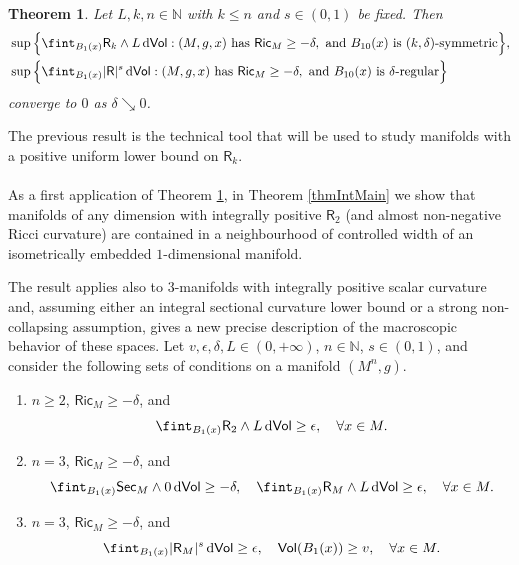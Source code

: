 \documentclass[10pt]{article}
\newtheorem{thm}{Theorem}[section]
\theoremstyle{definition}
\newcommand{\bb}[1]{\mathbb{#1}}
\newcommand{\ssf}[1]{\mathsf{#1}}
\newcommand{\Ric}{\mathsf{Ric}}
\newcommand{\R}{\mathsf{R}}
\newcommand{\de}{{\rm d}}
\begin{document}
\begin{thm} \label{CT1}
    Let $L,k,n \in \bb{N}$ with $k \leq n$ and $s \in (0,1)$ be fixed. Then 
    \begin{align*}
    &\sup \Big\{\fint_{B_1(x)} \R_{k} \wedge L \, \de \ssf{Vol} : (M,g,x) \text{ has } \Ric_{M} \geq -\delta, \text{ and } B_{10}(x) \text{ is  $(k,\delta)$-symmetric} 
    \Big\} ,
    \\
    &  \sup \Big\{\fint_{B_1(x)} |\R|^s \, \de \ssf{Vol} : (M,g,x) \text{ has } \Ric_{M} \geq -\delta, \text{ and } B_{10}(x) \text{ is } \delta \text{-regular} 
    \Big\}  
    \end{align*}
    converge to $0$ as $\delta \searrow 0$.
    \end{thm}

The previous result is the technical tool that will be used to study manifolds with a positive uniform lower bound on $\R_k$. 
\\
\\
As a first application of Theorem \ref{CT1}, in Theorem \ref{thmIntMain} we show that manifolds of any dimension with integrally positive $\R_2$ (and almost non-negative Ricci curvature) are contained in a neighbourhood of controlled width of an isometrically embedded $1$-dimensional manifold. 

The result applies also to $3$-manifolds with integrally positive scalar curvature and, assuming either an integral sectional curvature lower bound or a strong non-collapsing assumption, gives a new precise description of the macroscopic behavior of these spaces. Let $v,\epsilon, \delta,L \in (0,+\infty)$, $n \in \bb{N}$, $s \in (0,1)$, and consider the following sets of conditions on a manifold $(M^n,g)$.

\begin{enumerate}[label = (\roman*)]
        \item \label{Condition1Int}  $n\geq 2$, $\ssf{Ric}_{M} \geq -\delta$, and
    \begin{equation*} %
     \fint_{B_1(x)} \R_{2} \wedge L \,\de\ssf{Vol}  \geq \epsilon, \quad \forall x \in M.
    \end{equation*}
    \item\label{condition2Int} $n=3$, $\ssf{Ric}_{M} \geq -\delta$, and
    \begin{equation*} %
    \fint_{B_1(x)} \ssf{Sec}_{M} \wedge 0 \, \de \ssf{Vol} \geq -\delta, \quad  \fint_{B_1(x)} \R_{M} \wedge L \,\de\ssf{Vol}  \geq \epsilon, \quad \forall x \in M.
    \end{equation*}
    \item \label{condition3Int} $n=3$, $\ssf{Ric}_{M} \geq -\delta$, and
    \begin{equation*} %
     \fint_{B_1(x)} |\R_{M}|^s \,\de\ssf{Vol}  \geq \epsilon, \quad \ssf{Vol}(B_1(x)) \geq v, \quad \forall x \in M.
    \end{equation*}
    \end{enumerate}
\end{document}
